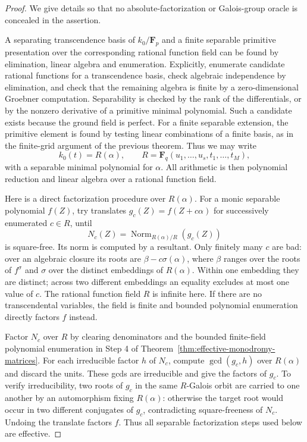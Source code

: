 \begin{proof}
We give details so that no absolute-factorization or
Galois-group oracle is concealed in the assertion.

A separating transcendence basis of $k_0/\mathbf F_p$
and a finite separable primitive presentation over the
corresponding rational function field can be found
by elimination, linear algebra and enumeration.
Explicitly, enumerate candidate rational functions
for a transcendence basis, check algebraic independence
by elimination, and check that the remaining algebra
is finite by a zero-dimensional Groebner computation.
Separability is checked by the rank of the differentials,
or by the nonzero derivative of a primitive minimal
polynomial.  Such a candidate exists because the
ground field is perfect.  For a finite separable
extension, the primitive element is found by testing
linear combinations of a finite basis, as in the
finite-grid argument of the previous theorem.
Thus we may write
\[
 k_0(t)=R(\alpha),\qquad
 R=\mathbf F_q(u_1,\ldots,u_s,t_1,\ldots,t_M),
\]
with a separable minimal polynomial for $\alpha$.
All arithmetic is then polynomial reduction and linear
algebra over a rational function field.

Here is a direct factorization procedure over $R(\alpha)$.
For a monic separable polynomial $f(Z)$, try translates
$g_c(Z)=f(Z+c\alpha)$ for successively enumerated
$c\in R$, until
\[
 N_c(Z)=\operatorname{Norm}_{R(\alpha)/R}(g_c(Z))
\]
is square-free.  Its norm is computed by a resultant.
Only finitely many $c$ are bad: over an algebraic
closure its roots are $\beta-c\sigma(\alpha)$, where
$\beta$ ranges over the roots of $f^\sigma$ and
$\sigma$ over the distinct embeddings of $R(\alpha)$.
Within one embedding they are distinct; across two
different embeddings an equality excludes at most
one value of $c$.  The rational function field $R$
is infinite here.  If there are no transcendental
variables, the field is finite and bounded polynomial
enumeration directly factors $f$ instead.

Factor $N_c$ over $R$ by clearing denominators and
the bounded finite-field polynomial enumeration in
Step 4 of Theorem~\ref{thm:effective-monodromy-matrices}.
For each irreducible factor $h$ of $N_c$, compute
$\gcd(g_c,h)$ over $R(\alpha)$ and discard the units.
These gcds are irreducible and give the factors of
$g_c$.  To verify irreducibility, two roots of $g_c$
in the same $R$-Galois orbit are carried to one another
by an automorphism fixing $R(\alpha)$: otherwise the
target root would occur in two different conjugates
of $g_c$, contradicting square-freeness of $N_c$.
Undoing the translate factors $f$.  Thus all separable
factorization steps used below are effective.


\end{proof}
